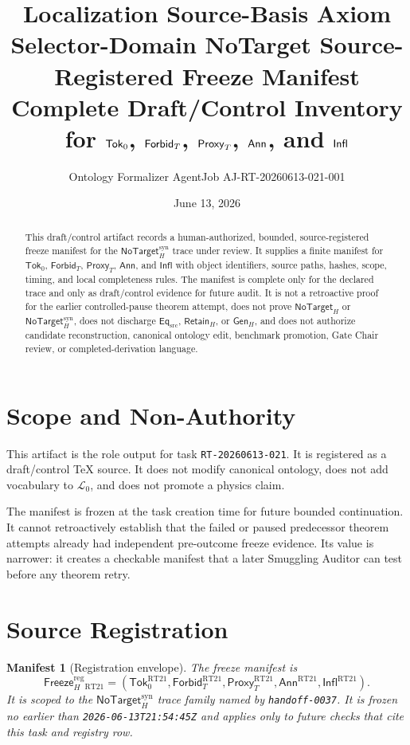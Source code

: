 \documentclass[11pt]{article}
\title{\textbf{Localization Source-Basis Axiom Selector-Domain NoTarget Source-Registered Freeze Manifest}\\[0.35em]
\large Complete Draft/Control Inventory for \(\SrcTok\), \(\ForbidT\), \(\ProxyT\), \(\Annot\), and \(\Influence\)}
\author{Ontology Formalizer AgentJob AJ-RT-20260613-021-001}
\date{June 13, 2026}
\newcommand{\Lang}{\mathcal{L}_{0}}
\newcommand{\GenH}{\mathsf{Gen}_{H}}
\newcommand{\EqSrc}{\mathsf{Eq}_{\mathrm{src}}}
\newcommand{\RetainH}{\mathsf{Retain}_{H}}
\newcommand{\NoTargetH}{\mathsf{NoTarget}_{H}}
\newcommand{\NoTargetSyn}{\mathsf{NoTarget}_{H}^{\mathrm{syn}}}
\newcommand{\SrcTok}{\mathsf{Tok}_{0}}
\newcommand{\ForbidT}{\mathsf{Forbid}_{T}}
\newcommand{\ProxyT}{\mathsf{Proxy}_{T}}
\newcommand{\Annot}{\mathsf{Ann}}
\newcommand{\Influence}{\mathsf{Infl}}
\newcommand{\FreezeH}{\mathsf{Freeze}_{H}}
\newtheorem{manifest}{Manifest}
\begin{document}
\maketitle

\begin{abstract}
This draft/control artifact records a human-authorized, bounded,
source-registered freeze manifest for the \(\NoTargetSyn\) trace under
review. It supplies a finite manifest for \(\SrcTok\), \(\ForbidT\),
\(\ProxyT\), \(\Annot\), and \(\Influence\) with object identifiers, source
paths, hashes, scope, timing, and local completeness rules. The manifest is
complete only for the declared trace and only as draft/control evidence for
future audit. It is not a retroactive proof for the earlier controlled-pause
theorem attempt, does not prove \(\NoTargetH\) or \(\NoTargetSyn\), does not
discharge \(\EqSrc\), \(\RetainH\), or \(\GenH\), and does not authorize
candidate reconstruction, canonical ontology edit, benchmark promotion, Gate
Chair review, or completed-derivation language.
\end{abstract}

\section{Scope and Non-Authority}

This artifact is the role output for task \texttt{RT-20260613-021}. It is
registered as a draft/control TeX source. It does not modify canonical
ontology, does not add vocabulary to \(\Lang\), and does not promote a
physics claim.

The manifest is frozen at the task creation time for future bounded
continuation. It cannot retroactively establish that the failed or paused
predecessor theorem attempts already had independent pre-outcome freeze
evidence. Its value is narrower: it creates a checkable manifest that a later
Smuggling Auditor can test before any theorem retry.

\section{Source Registration}

\begin{manifest}[Registration envelope]
The freeze manifest is
\[
    \FreezeH^{\mathrm{reg}}_{\mathrm{RT21}} =
    (\SrcTok^{\mathrm{RT21}},\ForbidT^{\mathrm{RT21}},
    \ProxyT^{\mathrm{RT21}},\Annot^{\mathrm{RT21}},
    \Influence^{\mathrm{RT21}}).
\]
It is scoped to the \(\NoTargetSyn\) trace family named by
\texttt{handoff-0037}. It is frozen no earlier than
\texttt{2026-06-13T21:54:45Z} and applies only to future checks that cite this
task and registry row.
\end{manifest}
\end{document}
